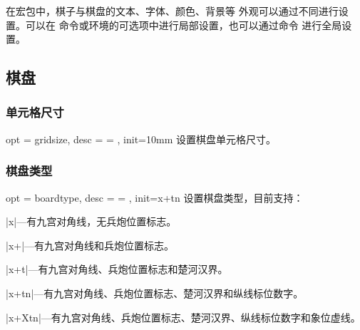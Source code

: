 \documentclass[full]{l3doc}
\begin{document}
\begin{documentation}
在宏包中，棋子与棋盘的文本、字体、颜色、背景等
外观可以通过不同进行设置。可以在
命令或环境的可选项中进行局部设置，也可以通过命令
进行全局设置。

\subsection{棋盘}

\subsubsection{单元格尺寸}

\begin{option}{ opt = gridsize, desc = {= }, init=10mm }
  设置棋盘单元格尺寸。
\end{option}

\begin{SideBySideExample}[frame=single,numbers=left,
                xrightmargin=.60\linewidth,gobble=2]
  \centering
  \cchessboard[gridsize=15mm]
\end{SideBySideExample}

\bigskip

\subsubsection{棋盘类型}

\begin{option}{ opt = boardtype, desc = {= }, init=x+tn }
  设置棋盘类型，目前支持：
\end{option}

  \begin{Description}[a]
    \item |x|---有九宫对角线，无兵炮位置标志。
    \item |x+|---有九宫对角线和兵炮位置标志。
    \item |x+t|---有九宫对角线、兵炮位置标志和楚河汉界。
    \item |x+tn|---有九宫对角线、兵炮位置标志、楚河汉界和纵线标位数字。
    \item |x+Xtn|---有九宫对角线、兵炮位置标志、楚河汉界、纵线标位数字和象位虚线。
  \end{Description}

\begin{SideBySideExample}[frame=single,numbers=left,
                xrightmargin=.54\linewidth,gobble=2]
  \centering
  \cchessboard*[boardtype=x]\quad
  \cchessboard*[boardtype=x+]\\
  \cchessboard*[boardtype=x+t]\quad
  \cchessboard*[boardtype=x+tn]\\
  \cchessboard*[boardtype=x+Xtn]
\end{SideBySideExample}


\end{documentation}
\end{document}

